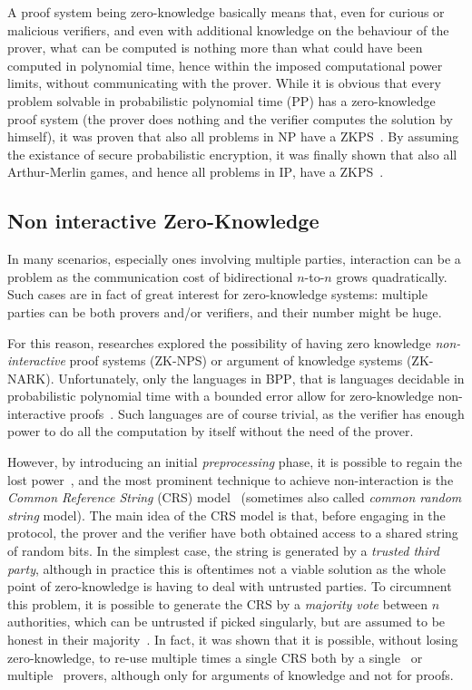 A proof system being zero-knowledge basically means that, even for curious or malicious verifiers,
and even with additional knowledge on the behaviour of the prover, what can be computed is nothing 
more than what could have been computed in polynomial time, hence within the imposed computational 
power limits, without communicating with the prover.
While it is obvious that every problem solvable in probabilistic polynomial time 
(\textsc{PP}) has a zero-knowledge proof system (the prover does nothing and the verifier computes 
the solution by himself), it was proven that also all problems in \textsc{NP} have a 
ZKPS~\cite{GoldreichMW1991}. 
By assuming the existance of secure probabilistic encryption, it was finally shown that also 
all Arthur-Merlin games, and hence all problems in \textsc{IP}, have a ZKPS~\cite{BenorGGHKMR1990}.

\subsection{Non interactive Zero-Knowledge}\label{subsec:nizk}
In many scenarios, especially ones involving multiple parties, interaction can be a problem as
the communication cost of bidirectional \(n\)-to-\(n\) grows quadratically.
Such cases are in fact of great interest for zero-knowledge systems: multiple parties can be 
both provers and/or verifiers, and their number might be huge.

For this reason, researches explored the possibility of having zero knowledge \emph{non-interactive} 
proof systems (ZK-NPS) or argument of knowledge systems (ZK-NARK).
Unfortunately, only the languages in \textsc{BPP}, that is languages decidable in 
probabilistic polynomial time with a bounded error allow for zero-knowledge non-interactive 
proofs~\cite{Oren1987,GoldreichK1996}. Such languages are of course trivial, as the verifier has 
enough power to do all the computation by itself without the need of the prover.

However, by introducing an initial \emph{preprocessing} phase, it is possible to regain the lost 
power~\cite{SantisMP1990}, and the most prominent technique to achieve non-interaction is the 
\emph{Common Reference String} (CRS) model~\cite{BlumFM1988} (sometimes also called 
\emph{common random string} model).
The main idea of the CRS model is that, before engaging in the protocol, the prover and 
the verifier have both obtained access to a shared string of random bits. 
In the simplest case, the string is generated by a \emph{trusted third party}, although in 
practice this is oftentimes not a viable solution as the whole point of zero-knowledge is having 
to deal with untrusted parties. 
To circumnent this problem, it is possible to generate the CRS by a \emph{majority vote}
between \(n\) authorities, which can be untrusted if picked singularly, but are assumed to be 
honest in their majority~\cite{GrothO2006}.
In fact, it was shown that it is possible, without losing zero-knowledge, to re-use multiple times 
a single CRS both by a single~\cite{BlumSMP1991} or multiple~\cite{FeigeLS1990} provers, although 
only for arguments of knowledge and not for proofs.

